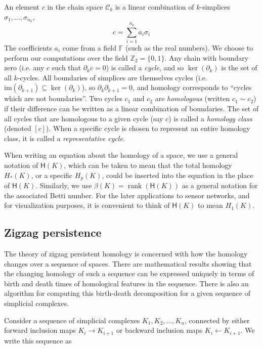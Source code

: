 \documentclass[12pt]{article}
\DeclareMathOperator{\rank}{rank}
\begin{document}
An element $c$ in the chain space $\mathcal{C}_k$ is a linear combination of $k$-simplices $\sigma_1, \ldots, \sigma_{n_k}$,
\[ c = \sum_{i=1}^{n_k} a_i \sigma_i \]
The coefficients $a_i$ come from a field $\mathbb{F}$ (such as the real numbers). We choose to perform our computations over the field $\mathbb{Z}_2 = \{0,1\}$. Any chain with boundary zero (i.e. any $c$ such that $\partial_k c = 0$) is called a \textit{cycle}, and so $\ker(\partial_k)$ is the set of all $k$-cycles. All boundaries of simplices are themselves cycles (i.e. $\mbox{im}(\partial_{k+1}) \subseteq \ker(\partial_k)$), so $\partial_k \partial_{k+1} = 0$, and homology corresponds to ``cycles which are not boundaries''. Two cycles $c_1$ and $c_2$ are \textit{homologous} (written $c_1 \sim c_2$) if their difference can be written as a linear combination of boundaries. The set of all cycles that are homologous to a given cycle (say $c$) is called a \textit{homology class} (denoted $[c]$). When a specific cycle is chosen to represent an entire homology class, it is called a \textit{representative cycle}.

When writing an equation about the homology of a space, we use a general notation of $\mathsf{H}(K)$, which can be taken to mean that the total homology $H_*(K)$, or a specific $H_p(K)$, could be inserted into the equation in the place of $\mathsf{H}(K)$. Similarly, we use $\mathsf{\beta}(K) = \rank(\mathsf{H}(K))$ as a general notation for the associated Betti number. For the later applications to sensor networks, and for visualization purposes, it is convenient to think of $\mathsf{H}(K)$ to mean $H_1(K)$.

\subsection{Zigzag persistence}
The theory of zigzag persistent homology is concerned with how the homology changes over a sequence of spaces. There are mathematical results \cite{carlsson2010} showing that the changing homology of such a sequence can be expressed uniquely in terms of birth and death times of homological features in the sequence. There is also an algorithm \cite{carlsson2009b} for computing this birth-death decomposition for a given sequence of simplicial complexes.

Consider a sequence of simplicial complexes $K_1, K_2, \ldots, K_n$, connected by either forward inclusion maps $K_i \rightarrow K_{i+1}$ or backward inclusion maps $K_i \leftarrow K_{i+1}$. We write this sequence as
\end{document}
